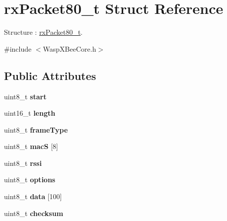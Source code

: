 \hypertarget{structrx_packet80__t}{}\section{rx\+Packet80\+\_\+t Struct Reference}
\label{structrx_packet80__t}


Structure \+: \hyperlink{structrx_packet80__t}{rx\+Packet80\+\_\+t}.  




{\ttfamily \#include $<$Wasp\+X\+Bee\+Core.\+h$>$}

\subsection*{Public Attributes}
\begin{DoxyCompactItemize}
\item 
uint8\+\_\+t {\bfseries start}\hypertarget{structrx_packet80__t_a5a670fa5d436eaa5be666073aa7572fc}{}\label{structrx_packet80__t_a5a670fa5d436eaa5be666073aa7572fc}

\item 
uint16\+\_\+t {\bfseries length}\hypertarget{structrx_packet80__t_a5a2069a49c17d32a532ec1b7ecb95292}{}\label{structrx_packet80__t_a5a2069a49c17d32a532ec1b7ecb95292}

\item 
uint8\+\_\+t {\bfseries frame\+Type}\hypertarget{structrx_packet80__t_a3ab98543ee01e06fff8c4c520ac03095}{}\label{structrx_packet80__t_a3ab98543ee01e06fff8c4c520ac03095}

\item 
uint8\+\_\+t {\bfseries macS} \mbox{[}8\mbox{]}\hypertarget{structrx_packet80__t_a905aa1192f942fb185023168a29176b7}{}\label{structrx_packet80__t_a905aa1192f942fb185023168a29176b7}

\item 
uint8\+\_\+t {\bfseries rssi}\hypertarget{structrx_packet80__t_a4633301c2f780705da7cc3b870fd0588}{}\label{structrx_packet80__t_a4633301c2f780705da7cc3b870fd0588}

\item 
uint8\+\_\+t {\bfseries options}\hypertarget{structrx_packet80__t_a9f70959f8ac6c4bdc1376640a04ace24}{}\label{structrx_packet80__t_a9f70959f8ac6c4bdc1376640a04ace24}

\item 
uint8\+\_\+t {\bfseries data} \mbox{[}100\mbox{]}\hypertarget{structrx_packet80__t_ae01a2219daa44cefef37b2e321238e07}{}\label{structrx_packet80__t_ae01a2219daa44cefef37b2e321238e07}

\item 
uint8\+\_\+t {\bfseries checksum}\hypertarget{structrx_packet80__t_af9513891415b72399b7b50ac4a5a3d57}{}\label{structrx_packet80__t_af9513891415b72399b7b50ac4a5a3d57}

\end{DoxyCompactItemize}


